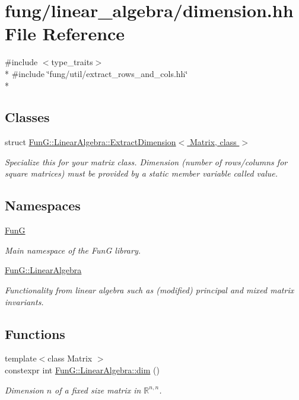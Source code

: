 \hypertarget{dimension_8hh}{\section{fung/linear\-\_\-algebra/dimension.hh File Reference}
\label{dimension_8hh}
}
{\ttfamily \#include $<$type\-\_\-traits$>$}\\*
{\ttfamily \#include \char`\"{}fung/util/extract\-\_\-rows\-\_\-and\-\_\-cols.\-hh\char`\"{}}\\*
\subsection*{Classes}
\begin{DoxyCompactItemize}
\item 
struct \hyperlink{structFunG_1_1LinearAlgebra_1_1ExtractDimension}{Fun\-G\-::\-Linear\-Algebra\-::\-Extract\-Dimension$<$ Matrix, class $>$}
\begin{DoxyCompactList}\small\item\em Specialize this for your matrix class. Dimension (number of rows/columns for square matrices) must be provided by a static member variable called value. \end{DoxyCompactList}\end{DoxyCompactItemize}
\subsection*{Namespaces}
\begin{DoxyCompactItemize}
\item 
\hyperlink{namespaceFunG}{Fun\-G}
\begin{DoxyCompactList}\small\item\em Main namespace of the Fun\-G library. \end{DoxyCompactList}\item 
\hyperlink{namespaceFunG_1_1LinearAlgebra}{Fun\-G\-::\-Linear\-Algebra}
\begin{DoxyCompactList}\small\item\em Functionality from linear algebra such as (modified) principal and mixed matrix invariants. \end{DoxyCompactList}\end{DoxyCompactItemize}
\subsection*{Functions}
\begin{DoxyCompactItemize}
\item 
{\footnotesize template$<$class Matrix $>$ }\\constexpr int \hyperlink{namespaceFunG_1_1LinearAlgebra_a13a029820c29d530274ae94968d642d4}{Fun\-G\-::\-Linear\-Algebra\-::dim} ()
\begin{DoxyCompactList}\small\item\em Dimension $n$ of a fixed size matrix in $\mathbb{R}^{n,n}$. \end{DoxyCompactList}\end{DoxyCompactItemize}
